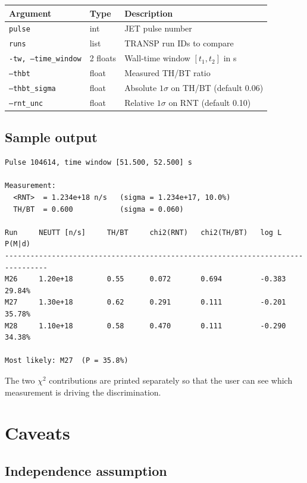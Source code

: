 \documentclass[11pt,a4paper]{article}
\begin{document}
\begin{tabular}{@{}lll@{}}
\toprule
Argument                & Type     & Description \\
\midrule
\texttt{pulse}              & int      & JET pulse number \\
\texttt{runs}               & list     & TRANSP run IDs to compare \\
\texttt{-tw, --time\_window} & 2 floats & Wall-time window $[t_1, t_2]$ in s \\
\texttt{--thbt}              & float    & Measured TH/BT ratio \\
\texttt{--thbt\_sigma}       & float    & Absolute $1\sigma$ on TH/BT (default 0.06) \\
\texttt{--rnt\_unc}          & float    & Relative $1\sigma$ on RNT (default 0.10) \\
\bottomrule
\end{tabular}

\subsection{Sample output}

\begin{lstlisting}
Pulse 104614, time window [51.500, 52.500] s

Measurement:
  <RNT>  = 1.234e+18 n/s   (sigma = 1.234e+17, 10.0%)
  TH/BT  = 0.600           (sigma = 0.060)

Run     NEUTT [n/s]     TH/BT     chi2(RNT)   chi2(TH/BT)   log L         P(M|d)
--------------------------------------------------------------------------------
M26     1.20e+18        0.55      0.072       0.694         -0.383        29.84%
M27     1.30e+18        0.62      0.291       0.111         -0.201        35.78%
M28     1.10e+18        0.58      0.470       0.111         -0.290        34.38%

Most likely: M27  (P = 35.8%)
\end{lstlisting}

The two $\chi^2$ contributions are printed separately so that the user can
see which measurement is driving the discrimination.

\section{Caveats}

\subsection{Independence assumption}
\end{document}
